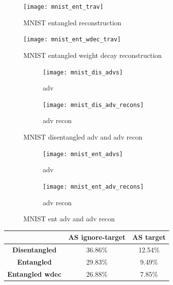 \documentclass{report}
\begin{document}
\begin{figure}
\begin{center}
\texttt{[image: mnist\_ent\_trav]}
\end{center}
\caption{MNIST entangled reconstruction}
\end{figure}

\begin{figure}
\begin{center}
\texttt{[image: mnist\_ent\_wdec\_trav]}
\end{center}
\caption{MNIST entangled weight decay reconstruction}
\end{figure}

\begin{figure}
\begin{subfigure}{.5\textwidth}
  \centering
  \texttt{[image: mnist\_dis\_advs]}
  \caption{adv}
\end{subfigure}%
\begin{subfigure}{.5\textwidth}
  \centering
  \texttt{[image: mnist\_dis\_adv\_recons]}
  \caption{adv recon}
\end{subfigure}
\caption{MNIST disentangled adv and adv recon}
\label{fig:mnist-dis-advs}
\end{figure}

\begin{figure}
\begin{subfigure}{.5\textwidth}
  \centering
  \texttt{[image: mnist\_ent\_advs]}
  \caption{adv}
\end{subfigure}%
\begin{subfigure}{.5\textwidth}
  \centering
  \texttt{[image: mnist\_ent\_adv\_recons]}
  \caption{adv recon}
\end{subfigure}
\caption{MNIST ent adv and adv recon}
\label{fig:mnist-ent-advs}
\end{figure}

\begin{center}
  \begin{tabular}{|c|c|c|}
  \hline
   & \textbf{AS ignore-target} & \textbf{AS target} \\ \hline
  \textbf{Disentangled} & 36.86\% & 12.54\% \\ \hline
  \textbf{Entangled} & 29.83\% & 9.49\% \\ \hline
  \textbf{Entangled wdec} & 26.88\% & 7.85\% \\ \hline
  \end{tabular}
\end{center}
\end{document}
